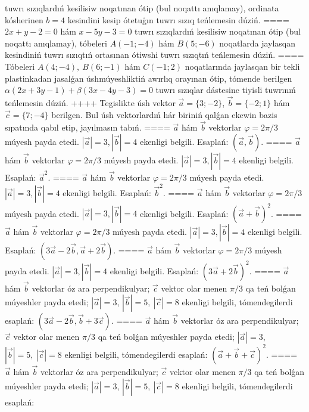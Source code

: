 tuwrı sızıqlardıń kesilisiw noqatınan ótip (bul noqattı anıqlamay), ordinata
kósherinen \(b=4\) kesindini kesip ótetuģın tuwrı sızıq teńlemesin dúziń.
====
\(2x+y-2=0\) hám \(x-5y-3=0\)
tuwrı sızıqlardıń kesilisiw noqatınan ótip (bul noqattı anıqlamay), tóbeleri
\(A (-1;-4) \) hám \(B (5;-6) \) noqatlarda jaylasqan kesindiniń
tuwrı sızıqtıń ortasınan ótiwshi tuwrı sızıqtıń teńlemesin dúziń.
====
Tóbeleri \(A (4;-4),\ B (6;-1) \) hám \(C (-1;2) \)
noqatlarında jaylasqan bir tekli plastinkadan jasalǵan úshmúyeshliktiń
awırlıq orayınan ótip, tómende berilgen 
\(\alpha (2x+3y-1) +\beta (3x-4y-3) =0\) tuwrı sızıqlar dástesine 
tiyisli tuwrınıń teńlemesin dúziń.
++++
Tegislikte úsh vektor $\vec{a} = \{ 3; - 2\}$, $\vec{b} = \{ - 2;1\}$ hám $\vec{c} = \{ 7; - 4\}$ berilgen. Bul úsh vektorlardıń hár biriniń qalǵan ekewin bazis sıpatında qabıl etip, jayılmasın tabıń.
====
$\vec{a}$ hám $\vec{b}$ vektorlar $\varphi = 2\pi/3$ múyesh payda etedi. $|\vec{a}| = 3,|\vec{b}| = 4$ ekenligi belgili. Esaplań:
$\left(\vec{a},\vec{b} \right) $.
====
$\vec{a}$ hám $\vec{b}$ vektorlar $\varphi = 2\pi/3$ múyesh payda etedi. $|\vec{a}| = 3,|\vec{b}| = 4$ ekenligi belgili. Esaplań:
${\vec{a}}^{2}$.
====
$\vec{a}$ hám $\vec{b}$ vektorlar $\varphi = 2\pi/3$ múyesh payda etedi. $|\vec{a}| = 3,|\vec{b}| = 4$ ekenligi belgili. Esaplań:
${\vec{b}}^{2}$.
====
$\vec{a}$ hám $\vec{b}$ vektorlar $\varphi = 2\pi/3$ múyesh payda etedi. $|\vec{a}| = 3,|\vec{b}| = 4$ ekenligi belgili. Esaplań:
$ (\vec{a} + \vec{b}) ^{2}$.
====
$\vec{a}$ hám $\vec{b}$ vektorlar $\varphi = 2\pi/3$ múyesh payda etedi. $|\vec{a}| = 3,|\vec{b}| = 4$ ekenligi belgili. Esaplań:
$\left(3\vec{a} - 2\vec{b},\vec{a} + 2\vec{b} \right) $.
====
$\vec{a}$ hám $\vec{b}$ vektorlar $\varphi = 2\pi/3$ múyesh payda etedi. $|\vec{a}| = 3,|\vec{b}| = 4$ ekenligi belgili. Esaplań: $ (3\vec{a} + 2\vec{b}) ^{2}$.
====
$\vec{a}$ hám $\vec{b}$ vektorlar óz ara perpendikulyar; $\vec{c}$ vektor olar menen $\pi/3$ qa teń bolǵan múyeshler payda etedi; $|\vec{a}| = 3$, $|\vec{b}| = 5,\ |\vec{c}| = 8$ ekenligi belgili, tómendegilerdi esaplań:
$\left(3\vec{a} - 2\vec{b},\vec{b} + 3\vec{c} \right) $.
====
$\vec{a}$ hám $\vec{b}$ vektorlar óz ara perpendikulyar; $\vec{c}$ vektor olar menen $\pi/3$ qa teń bolǵan múyeshler payda etedi; $|\vec{a}| = 3$, $|\vec{b}| = 5,\ |\vec{c}| = 8$ ekenligi belgili, tómendegilerdi esaplań:
$ (\vec{a} + \vec{b} + \vec{c}) ^{2}$.
====
$\vec{a}$ hám $\vec{b}$ vektorlar óz ara perpendikulyar; $\vec{c}$ vektor olar menen $\pi/3$ qa teń bolǵan múyeshler payda etedi; $|\vec{a}| = 3$, $|\vec{b}| = 5,\ |\vec{c}| = 8$ ekenligi belgili, tómendegilerdi esaplań:
